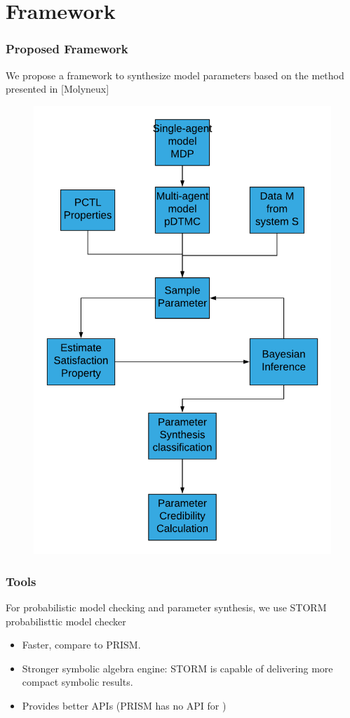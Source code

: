 \documentclass{beamer}
\begin{document}
\section{Framework}
\begin{frame}
  \frametitle{Proposed Framework}
  We propose a framework to synthesize model parameters based on the method
  presented in [Molyneux]
  \begin{figure}[t]
    \includegraphics[height=\textheight]{abcsmc2.png} \centering
  \end{figure}
\end{frame}

\begin{frame}
  \frametitle{Tools}
  For probabilistic model checking and parameter synthesis, we use STORM
  probabilisttic model checker
  \begin{itemize}
    \item Faster, compare to PRISM.
    \item Stronger symbolic algebra engine: STORM is capable of delivering more
          compact symbolic results.
    \item Provides better APIs (PRISM has no API for )
  \end{itemize}
\end{frame}
\end{document}
